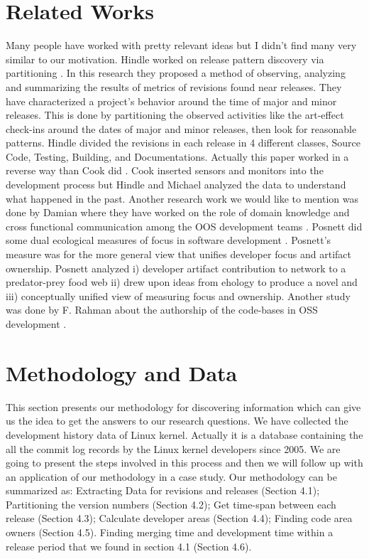 \documentclass{acm_proc_article-sp}
\begin{document}
\section{Related Works}
Many people have worked with pretty relevant ideas but I didn't find many very similar to our motivation. Hindle worked on release pattern discovery via partitioning \cite{9_hindle}. In this research they proposed a method of observing, analyzing and summarizing the results of metrics of revisions found near releases. They have characterized a project's behavior around the time of major and minor releases. This is done by partitioning the observed activities like the art-effect check-ins around the dates of major and minor releases, then look for reasonable patterns. Hindle divided the revisions in each release in 4 different classes, Source Code, Testing, Building, and Documentations. Actually this paper worked in a reverse way than Cook did \cite{10_cook}. Cook inserted sensors and monitors into the development process but Hindle and Michael analyzed the data to understand what happened in the past.
Another research work we would like to mention was done by  Damian where they have worked on the role of domain knowledge and cross functional communication among the OOS development teams \cite{11_damian}. Posnett did some dual ecological measures of focus in software development \cite{12_posnett}. Posnett's measure was for the more general view that unifies developer focus and artifact ownership. Posnett analyzed i) developer artifact contribution to network to a predator-prey food web ii) drew upon ideas from ehology to produce a novel and iii) conceptually unified view of measuring focus and ownership. Another study was done by F. Rahman about the authorship of the code-bases in OSS development \cite{13_rahman}.

\section{Methodology and Data}
This section presents our methodology for discovering information which can give us the idea to get the answers to our research questions. We have collected the development history data of Linux kernel. Actually it is a database containing the all the commit log records by the Linux kernel developers since 2005. We are going to present the steps involved in this process and then we will follow up with an application of our methodology in a case study.
Our methodology can be summarized as: Extracting Data for revisions and releases (Section 4.1); Partitioning the version numbers (Section 4.2); Get time-span between each release (Section 4.3); Calculate developer areas (Section 4.4); Finding code area owners (Section 4.5). Finding merging time and development time within a release period that we found in section 4.1 (Section 4.6). 
\end{document}
